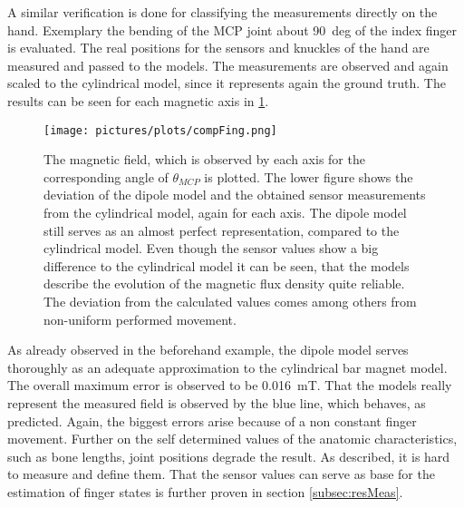 A similar verification is done for classifying the measurements directly on the hand. Exemplary the bending of the \ac{MCP} joint about \SI{90}{deg} of the index finger is evaluated. The real positions for the sensors and knuckles of the hand are measured and passed to the models. The measurements are observed and again scaled to the cylindrical model, since it represents again the ground truth. The results can be seen for each magnetic axis in \ref{fig:modCompHand}.
\begin{figure}[h]
\centering
\texttt{[image: pictures/plots/compFing.png]}
\caption[Comparing the models and sensor measurements for finger movement]
{The magnetic field, which is observed by each axis for the corresponding angle of $ \theta_{MCP} $ is plotted. The lower figure shows the deviation of the dipole model and the obtained sensor measurements from the cylindrical model, again for each axis. The dipole model still serves as an almost perfect representation, compared to the cylindrical model. Even though the sensor values show a big difference to the cylindrical model it can be seen, that the models describe the evolution of the magnetic flux density quite reliable. The deviation from the calculated values comes among others from non-uniform performed movement.}
\label{fig:modCompHand}
\end{figure}
As already observed in the beforehand example, the dipole model serves thoroughly as an adequate approximation to the cylindrical bar magnet model. The overall maximum error is observed to be \SI{0.016}{\milli \tesla}. That the models really represent the measured field is observed by the blue line, which behaves, as predicted. Again, the biggest errors arise because of a non constant finger movement. Further on the self determined values of the anatomic characteristics, such as bone lengths, joint positions degrade the result. As described, it is hard to measure and define them. That the sensor values can serve as base for the estimation of finger states is further proven in section \ref{subsec:resMeas}.

